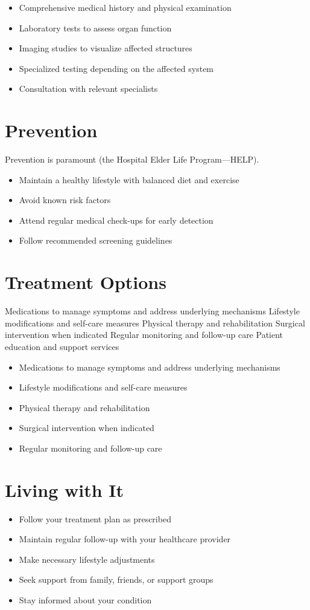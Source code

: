 \begin{itemize}[noitemsep]
  \item Comprehensive medical history and physical examination
  \item Laboratory tests to assess organ function
  \item Imaging studies to visualize affected structures
  \item Specialized testing depending on the affected system
  \item Consultation with relevant specialists
\end{itemize}
\section{Prevention}
Prevention is paramount (the Hospital Elder Life Program---HELP).

\begin{itemize}[noitemsep]
  \item Maintain a healthy lifestyle with balanced diet and exercise
  \item Avoid known risk factors
  \item Attend regular medical check-ups for early detection
  \item Follow recommended screening guidelines
\end{itemize}
\section{Treatment Options}
Medications to manage symptoms and address underlying mechanisms Lifestyle modifications and self-care measures Physical therapy and rehabilitation Surgical intervention when indicated Regular monitoring and follow-up care Patient education and support services

\begin{itemize}[noitemsep]
  \item Medications to manage symptoms and address underlying mechanisms
  \item Lifestyle modifications and self-care measures
  \item Physical therapy and rehabilitation
  \item Surgical intervention when indicated
  \item Regular monitoring and follow-up care
\end{itemize}
\section{Living with It}
\begin{itemize}[noitemsep]
  \item Follow your treatment plan as prescribed
  \item Maintain regular follow-up with your healthcare provider
  \item Make necessary lifestyle adjustments
  \item Seek support from family, friends, or support groups
  \item Stay informed about your condition
\end{itemize}
